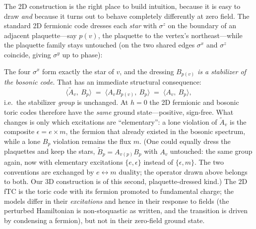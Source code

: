 \documentclass[11pt]{article}
\newcommand{\Av}{A_v}
\newcommand{\Bp}{B_p}
\newcommand{\sx}{\sigma^x}
\newcommand{\sy}{\sigma^y}
\newcommand{\sz}{\sigma^z}
\begin{document}
The 2D construction is the right place to build intuition, because it is easy
to draw \emph{and} because it turns out to behave completely differently at
zero field. The standard 2D fermionic code dresses each \emph{star} with
$\sz$ on the boundary of an adjacent plaquette---say $p(v)$, the plaquette to
the vertex's northeast---while the plaquette family stays untouched (on the
two shared edges $\sx$ and $\sz$ coincide, giving $\sy$ up to phase):

\begin{center}
\qquad\qquad
{}
\end{center}

\noindent
The four $\sx$ form exactly the star of $v$, and the dressing $B_{p(v)}$
\emph{is a stabilizer of the bosonic code}. That has an immediate structural
consequence:
\begin{equation}
\big\langle \tilde A_v,\ \Bp\big\rangle
\;=\;\big\langle A_v B_{p(v)},\ \Bp\big\rangle
\;=\;\big\langle A_v,\ \Bp\big\rangle ,
\end{equation}
i.e.\ the stabilizer \emph{group} is unchanged. At $h=0$ the 2D fermionic and
bosonic toric codes therefore have the \emph{same} ground state---positive,
sign-free. What changes is only which excitations are ``elementary'': a lone
violation of $\tilde A_v$ is the composite $\epsilon=e\times m$, the fermion
that already existed in the bosonic spectrum, while a lone $\Bp$ violation
remains the flux $m$. (One could equally dress the plaquettes and keep the
stars, $\tilde B_p=A_{v(p)}\Bp$ with $\Av$ untouched: the same group again,
now with elementary excitations $\{e,\epsilon\}$ instead of
$\{\epsilon,m\}$. The two conventions are exchanged by $e\leftrightarrow m$
duality; the operator drawn above belongs to both. Our 3D construction is of
this second, plaquette-dressed kind.) The 2D fTC is the toric code with its
fermion promoted to fundamental charge; the models differ in their
\emph{excitations} and hence in their response to fields (the perturbed
Hamiltonian is non-stoquastic as written, and the transition is driven by
condensing a fermion), but not in their zero-field ground state.
\end{document}
